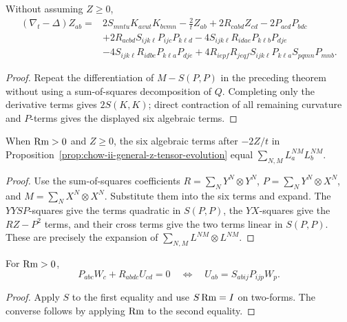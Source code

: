 \begin{proposition}
\label{prop:chow-ii-general-z-tensor-evolution}


Without assuming \(Z\ge0\),
\[
\begin{aligned}
(\nabla_t-\Delta)Z_{ab}={}&2S_{mntu}K_{avut}K_{bvmn}-\frac2tZ_{ab}
+2R_{cabd}Z_{cd}-2P_{acd}P_{bdc}\\
&+2R_{acbd}S_{ijk\ell}P_{ijc}P_{k\ell d}
-4S_{ijk\ell}R_{idae}P_{k\ell b}P_{dje}\\
&-4S_{ijk\ell}R_{idbe}P_{k\ell a}P_{dje}
+4R_{iepf}R_{jeqf}S_{ijk\ell}P_{k\ell a}S_{pqmn}P_{mnb}.
\end{aligned}
\]
\end{proposition}
\begin{proof}
\sketch Repeat the differentiation of \(M-S(P,P)\) in the preceding theorem without
using a sum-of-squares decomposition of \(Q\).  Completing only the derivative
terms gives \(2S(K,K)\); direct contraction of all remaining curvature and
\(P\)-terms gives the displayed six algebraic terms.
\end{proof}

\begin{lemma}
\label{lem:chow-ii-z-reaction-sum-of-squares}


When \(\operatorname{Rm}>0\) and \(Z\ge0\), the six algebraic terms after \(-2Z/t\) in
Proposition~\ref{prop:chow-ii-general-z-tensor-evolution} equal
\(\sum_{N,M}L_a^{NM}L_b^{NM}\).
\end{lemma}
\begin{proof}
\sketch Use the sum-of-squares coefficients
\(R=\sum_NY^N\otimes Y^N\),
\(P=\sum_NY^N\otimes X^N\), and
\(M=\sum_NX^N\otimes X^N\).  Substitute them into the six terms and expand.
The \(YYSP\)-squares give the terms quadratic in \(S(P,P)\), the \(YX\)-squares
give the \(RZ-P^2\) terms, and their cross terms give the two terms linear in
\(S(P,P)\).  These are precisely the expansion of
\(\sum_{N,M}L^{NM}\otimes L^{NM}\).
\end{proof}

\begin{lemma}
\label{lem:chow-ii-characterization-minimizing-two-form}

For \(\operatorname{Rm}>0\),
\[
P_{abc}W_c+R_{abdc}U_{cd}=0
\quad\Longleftrightarrow\quad
U_{ab}=S_{abij}P_{ijp}W_p.
\]
\end{lemma}
\begin{proof}
\sketch Apply \(S\) to the first equality and use \(S\operatorname{Rm}=I\) on two-forms.  The
converse follows by applying \(\operatorname{Rm}\) to the second equality.
\end{proof}

